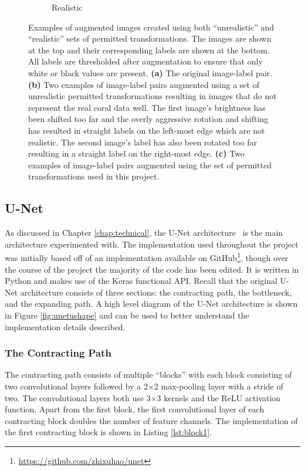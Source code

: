 \begin{figure}[t]
\begin{subfigure}[t]{0.38\textwidth}
        \caption{Realistic}
    \end{subfigure}
    \caption{Examples of augmented images created using both ``unrealistic'' and ``realistic'' sets of permitted transformations. The images are shown at the top and their corresponding labels are shown at the bottom. All labels are thresholded after augmentation to ensure that only white or black values are present. \textbf{(a)} The original image-label pair. \textbf{(b)} Two examples of image-label pairs augmented using a set of unrealistic permitted transformations resulting in images that do not represent the real coral data well. The first image's brightness has been shifted too far and the overly aggressive rotation and shifting has resulted in straight labels on the left-most edge which are not realistic. The second image's label has also been rotated too far resulting in a straight label on the right-most edge. \textbf{(c)} Two examples of image-label pairs augmented using the set of permitted transformations used in this project.}
    \label{fig:augexample}
\end{figure}

\subsection{U-Net}

As discussed in Chapter \ref{chap:technical}, the U-Net architecture~\cite{ronneberger2015u} is the main architecture experimented with. The implementation used throughout the project was initially based off of an implementation available on GitHub\footnote{\url{https://github.com/zhixuhao/unet}}, though over the course of the project the majority of the code has been edited. It is written in Python and makes use of the Keras functional API. Recall that the original U-Net architecture consists of three sections: the contracting path, the bottleneck, and the expanding path. A high level diagram of the U-Net architecture is shown in Figure \ref{fig:unetushape} and can be used to better understand the implementation details described.

\subsubsection{The Contracting Path}

The contracting path consists of multiple ``blocks'' with each block consisting of two convolutional layers followed by a 2$\times$2 max-pooling layer with a stride of two. The convolutional layers both use 3$\times$3 kernels and the ReLU activation function. Apart from the first block, the first convolutional layer of each contracting block doubles the number of feature channels. The implementation of the first contracting block is shown in Listing \ref{lst:block1}.

